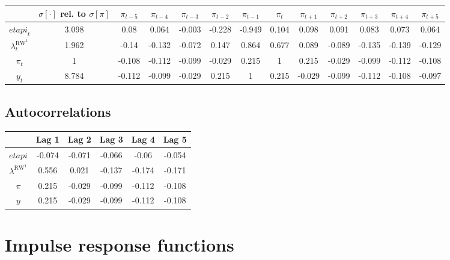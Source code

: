 \begin{tabular}{c|c|c|c|c|c|c|c|c|c|c|c|c|}
  & $\sigma[\cdot]$ rel. to $\sigma[\pi]$ & $\pi_{t-5}$ & $\pi_{t-4}$ & $\pi_{t-3}$ & $\pi_{t-2}$ & $\pi_{t-1}$ & $\pi_{t}$ & $\pi_{t+1}$ & $\pi_{t+2}$ & $\pi_{t+3}$ & $\pi_{t+4}$ & $\pi_{t+5}$\\
\hline
${e\!t\!a\!p\!i}_{t}$ & 3.098 & 0.08 & 0.064 & -0.003 & -0.228 & -0.949 & 0.104 & 0.098 & 0.091 & 0.083 & 0.073 & 0.064 \\
$\lambda^{\mathrm{RW}^{\mathrm{1}}}_{t}$ & 1.962 & -0.14 & -0.132 & -0.072 & 0.147 & 0.864 & 0.677 & 0.089 & -0.089 & -0.135 & -0.139 & -0.129 \\
$\pi_{t}$ & 1 & -0.108 & -0.112 & -0.099 & -0.029 & 0.215 & 1 & 0.215 & -0.029 & -0.099 & -0.112 & -0.108 \\
$y_{t}$ & 8.784 & -0.112 & -0.099 & -0.029 & 0.215 & 1 & 0.215 & -0.029 & -0.099 & -0.112 & -0.108 & -0.097 \\
\hline
\end{tabular}


\subsection{Autocorrelations}

\begin{tabular}{c|ccccc|}
  & Lag 1 & Lag 2 & Lag 3 & Lag 4 & Lag 5\\
\hline
${e\!t\!a\!p\!i}$ & -0.074 & -0.071 & -0.066 & -0.06 & -0.054 \\
$\lambda^{\mathrm{RW}^{\mathrm{1}}}$ & 0.556 & 0.021 & -0.137 & -0.174 & -0.171 \\
$\pi$ & 0.215 & -0.029 & -0.099 & -0.112 & -0.108 \\
$y$ & 0.215 & -0.029 & -0.099 & -0.112 & -0.108 \\
\hline
\end{tabular}



\pagebreak

\section{Impulse response functions}

